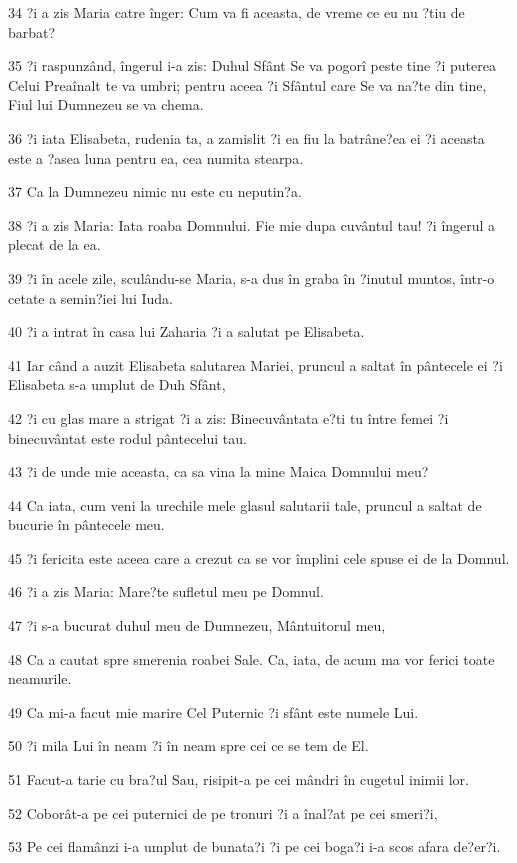 \par 34 ?i a zis Maria catre înger: Cum va fi aceasta, de vreme ce eu nu ?tiu de barbat?
\par 35 ?i raspunzând, îngerul i-a zis: Duhul Sfânt Se va pogorî peste tine ?i puterea Celui Preaînalt te va umbri; pentru aceea ?i Sfântul care Se va na?te din tine, Fiul lui Dumnezeu se va chema.
\par 36 ?i iata Elisabeta, rudenia ta, a zamislit ?i ea fiu la batrâne?ea ei ?i aceasta este a ?asea luna pentru ea, cea numita stearpa.
\par 37 Ca la Dumnezeu nimic nu este cu neputin?a.
\par 38 ?i a zis Maria: Iata roaba Domnului. Fie mie dupa cuvântul tau! ?i îngerul a plecat de la ea.
\par 39 ?i în acele zile, sculându-se Maria, s-a dus în graba în ?inutul muntos, într-o cetate a semin?iei lui Iuda.
\par 40 ?i a intrat în casa lui Zaharia ?i a salutat pe Elisabeta.
\par 41 Iar când a auzit Elisabeta salutarea Mariei, pruncul a saltat în pântecele ei ?i Elisabeta s-a umplut de Duh Sfânt,
\par 42 ?i cu glas mare a strigat ?i a zis: Binecuvântata e?ti tu între femei ?i binecuvântat este rodul pântecelui tau.
\par 43 ?i de unde mie aceasta, ca sa vina la mine Maica Domnului meu?
\par 44 Ca iata, cum veni la urechile mele glasul salutarii tale, pruncul a saltat de bucurie în pântecele meu.
\par 45 ?i fericita este aceea care a crezut ca se vor împlini cele spuse ei de la Domnul.
\par 46 ?i a zis Maria: Mare?te sufletul meu pe Domnul.
\par 47 ?i s-a bucurat duhul meu de Dumnezeu, Mântuitorul meu,
\par 48 Ca a cautat spre smerenia roabei Sale. Ca, iata, de acum ma vor ferici toate neamurile.
\par 49 Ca mi-a facut mie marire Cel Puternic ?i sfânt este numele Lui.
\par 50 ?i mila Lui în neam ?i în neam spre cei ce se tem de El.
\par 51 Facut-a tarie cu bra?ul Sau, risipit-a pe cei mândri în cugetul inimii lor.
\par 52 Coborât-a pe cei puternici de pe tronuri ?i a înal?at pe cei smeri?i,
\par 53 Pe cei flamânzi i-a umplut de bunata?i ?i pe cei boga?i i-a scos afara de?er?i.
